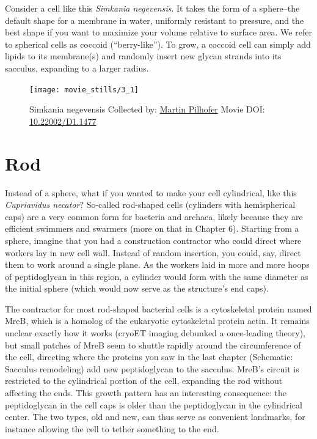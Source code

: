 \documentclass[]{tufte-book}
\begin{document}
Consider a cell like this \emph{Simkania negevensis}. It takes the form
of a sphere--the default shape for a membrane in water, uniformly
resistant to pressure, and the best shape if you want to maximize your
volume relative to surface area. We refer to spherical cells as coccoid
(``berry-like''). To grow, a coccoid cell can simply add lipids to its
membrane(s) and randomly insert new glycan strands into its sacculus,
expanding to a larger radius.





\begin{figure}
\texttt{[image: movie\_stills/3\_1]} \caption[Simkania negevensis Collected by:
\protect\hyperlink{martin_pilhofer}{Martin Pilhofer} Movie DOI:
\href{https://doi.org/10.22002/D1.1477}{10.22002/D1.1477}]{Simkania negevensis Collected by:
\protect\hyperlink{martin_pilhofer}{Martin Pilhofer} Movie DOI:
\href{https://doi.org/10.22002/D1.1477}{10.22002/D1.1477}}\label{fig:3-1}
\end{figure}

\section{Rod}\label{rod}

Instead of a sphere, what if you wanted to make your cell cylindrical,
like this \emph{Cupriavidus necator}? So-called rod-shaped cells
(cylinders with hemispherical caps) are a very common form for bacteria
and archaea, likely because they are efficient swimmers and swarmers
(more on that in Chapter 6). Starting from a sphere, imagine that you
had a construction contractor who could direct where workers lay in new
cell wall. Instead of random insertion, you could, say, direct them to
work around a single plane. As the workers laid in more and more hoops
of peptidoglycan in this region, a cylinder would form with the same
diameter as the initial sphere (which would now serve as the structure's
end caps).

The contractor for most rod-shaped bacterial cells is a cytoskeletal
protein named MreB, which is a homolog of the eukaryotic cytoskeletal
protein actin. It remains unclear exactly how it works (cryoET imaging
debunked a once-leading theory), but small patches of MreB seem to
shuttle rapidly around the circumference of the cell, directing where
the proteins you saw in the last chapter (Schematic: Sacculus
remodeling) add new peptidoglycan to the sacculus. MreB's circuit is
restricted to the cylindrical portion of the cell, expanding the rod
without affecting the ends. This growth pattern has an interesting
consequence: the peptidoglycan in the cell caps is older than the
peptidoglycan in the cylindrical center. The two types, old and new, can
thus serve as convenient landmarks, for instance allowing the cell to
tether something to the end.
\end{document}

